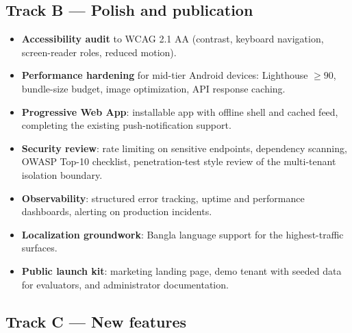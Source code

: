 \documentclass[11pt, a4paper]{article}
\begin{document}
\subsection{Track B --- Polish and publication}
\begin{itemize}[leftmargin=1.5em, itemsep=2pt]
    \item \textbf{Accessibility audit} to WCAG 2.1 AA (contrast, keyboard
    navigation, screen-reader roles, reduced motion).
    \item \textbf{Performance hardening} for mid-tier Android devices:
    Lighthouse $\geq 90$, bundle-size budget, image optimization, API
    response caching.
    \item \textbf{Progressive Web App}: installable app with offline shell
    and cached feed, completing the existing push-notification support.
    \item \textbf{Security review}: rate limiting on sensitive endpoints,
    dependency scanning, OWASP Top-10 checklist, penetration-test style
    review of the multi-tenant isolation boundary.
    \item \textbf{Observability}: structured error tracking, uptime and
    performance dashboards, alerting on production incidents.
    \item \textbf{Localization groundwork}: Bangla language support for the
    highest-traffic surfaces.
    \item \textbf{Public launch kit}: marketing landing page, demo tenant
    with seeded data for evaluators, and administrator documentation.
\end{itemize}

\subsection{Track C --- New features}
\end{document}
